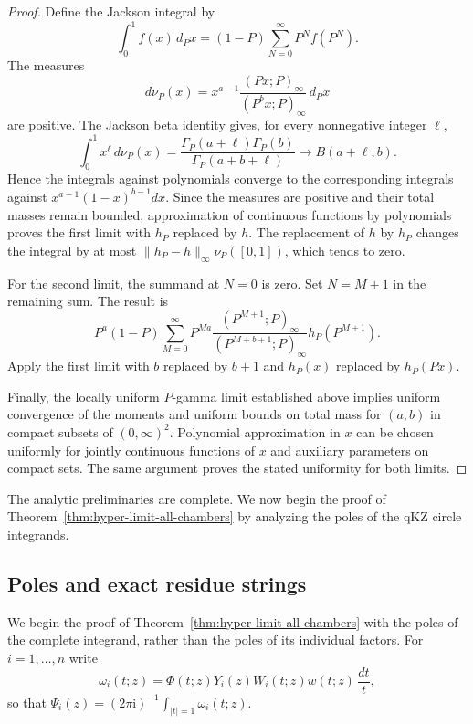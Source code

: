 \documentclass[12pt]{amsart}
\theoremstyle{definition}
\numberwithin{equation}{section}
\theoremstyle{definition}
\let\om\omega
\def\beq{\begin{equation}}
\def\eeq{\end{equation}}
\begin{document}
\begin{proof}
Define the Jackson integral by
\beq\label{eq:hyp-limit-Jackson}
 \int_0^1 f(x)\,d_Px=(1-P)\sum_{N=0}^\infty P^Nf(P^N).
\eeq
The measures
\[
 d\nu_P(x)=x^{a-1}
 \frac{(Px;P)_\infty}{(P^bx;P)_\infty}\,d_Px
\]
are positive.  The Jackson beta identity
\cite[DLMF, (5.18.11)--(5.18.12)]{DLMF} gives, for
every nonnegative integer $\ell$,
\[
 \int_0^1 x^\ell\,d\nu_P(x)
 =\frac{\Gamma_P(a+\ell)\Gamma_P(b)}
        {\Gamma_P(a+b+\ell)}
 \longrightarrow B(a+\ell,b).
\]
Hence the integrals against polynomials converge to the
corresponding integrals against
$x^{a-1}(1-x)^{b-1}dx$.  Since the measures are positive
and their total masses remain bounded, approximation of
continuous functions by polynomials proves the first limit
with $h_P$ replaced by $h$.  The replacement of $h$ by
$h_P$ changes the integral by at most
$\|h_P-h\|_\infty\nu_P([0,1])$, which tends to zero.

For the second limit, the summand at $N=0$ is zero.
Set $N=M+1$ in the remaining sum.  The result is
\[
 P^a(1-P)\sum_{M=0}^\infty P^{Ma}
 \frac{(P^{M+1};P)_\infty}{(P^{M+b+1};P)_\infty}
 h_P(P^{M+1}).
\]
Apply the first limit with $b$ replaced by $b+1$
and $h_P(x)$ replaced by $h_P(Px)$.

Finally, the locally uniform $P$-gamma limit established
above implies uniform convergence of the moments and uniform
bounds on total mass for $(a,b)$ in compact subsets of
$(0,\infty)^2$.  Polynomial approximation in $x$ can
be chosen uniformly for jointly continuous functions of
$x$ and auxiliary parameters on compact sets.  The same
argument proves the stated uniformity for both limits.
\end{proof}

The analytic preliminaries are complete.  We now begin the
proof of Theorem~\ref{thm:hyper-limit-all-chambers} by
analyzing the poles of the qKZ circle integrands.

\subsection{Poles and exact residue strings}
\label{subsec:hyp-limit-residues}

We begin the proof of Theorem~\ref{thm:hyper-limit-all-chambers}
with the poles of the complete integrand, rather than the poles
of its individual factors. For $i=1,\ldots,n$ write
\[
 \om_i(t;z)=\Phi(t;z)Y_i(z)W_i(t;z)w(t;z)\,\frac{dt}{t},
\]
so that $\Psi_i(z)=(2\pi\mathrm{i})^{-1}\int_{|t|=1}\om_i(t;z)$.
\end{document}
